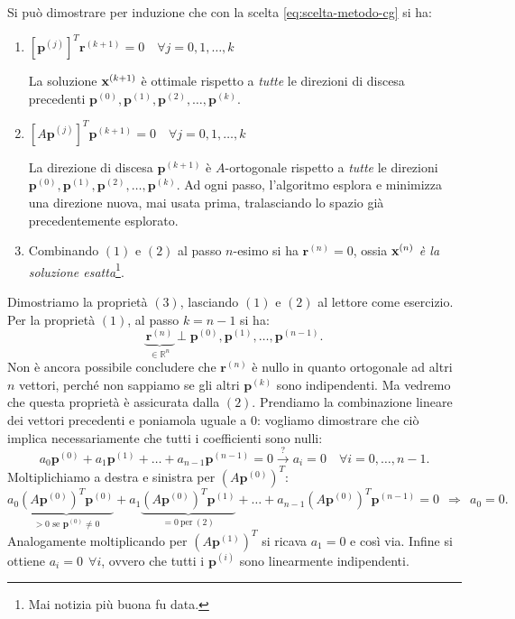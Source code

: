Si può dimostrare per induzione che con la scelta \eqref{eq:scelta-metodo-cg} si ha:
\begin{enumerate}
\item $\left[\mathbf{p}^{(j)}\right]^{T}\mathbf{r}^{( k+1)} =0 \quad \forall j=0,1,\dotsc ,k$

La soluzione $\mathbf{x}^{( k+1)}$ è ottimale rispetto a \textit{tutte} le direzioni di discesa precedenti $\mathbf{p}^{(0)} ,\mathbf{p}^{(1)} ,\mathbf{p}^{(2)} ,\dotsc ,\mathbf{p}^{(k)}$.
\item $\left[ A\mathbf{p}^{(j)}\right]^{T}\mathbf{p}^{( k+1)} =0 \quad \forall j=0,1,\dotsc ,k$

La direzione di discesa $\mathbf{p}^{( k+1)}$ è $A$-ortogonale rispetto a \textit{tutte} le direzioni $\mathbf{p}^{(0)} ,\mathbf{p}^{(1)} ,\mathbf{p}^{(2)} ,\dotsc ,\mathbf{p}^{(k)}$. Ad ogni passo, l'algoritmo esplora e minimizza una direzione nuova, mai usata prima, tralasciando lo spazio già precedentemente esplorato.
\item Combinando $(1)$ e $(2)$ al passo $n$-esimo si ha $\mathbf{r}^{(n)} =0$, ossia $\mathbf{x}^{(n)}$ \textit{è la soluzione esatta}\footnote{Mai notizia più buona fu data.}.
\end{enumerate}

Dimostriamo la proprietà $(3)$, lasciando $(1)$ e $(2)$ al lettore come esercizio.
Per la proprietà $(1)$, al passo $k=n-1$ si ha:
\begin{equation*}
\underbrace{\mathbf{r}^{(n)}}_{\in \mathbb{R}^{n}} \perp \mathbf{p}^{(0)} ,\mathbf{p}^{(1)} ,\dotsc ,\mathbf{p}^{( n-1)}.
\end{equation*}
Non è ancora possibile concludere che $\mathbf{r}^{(n)}$ è nullo in quanto ortogonale ad altri $n$ vettori, perché non sappiamo se gli altri $\mathbf{p}^{(k)}$ sono indipendenti.
Ma vedremo che questa proprietà è assicurata dalla $(2)$.
Prendiamo la combinazione lineare dei vettori precedenti e poniamola uguale a $0$: vogliamo dimostrare che ciò implica necessariamente che tutti i coefficienti sono nulli:
\begin{equation*}
a_{0}\mathbf{p}^{(0)} +a_{1}\mathbf{p}^{(1)} +\dotsc +a_{n-1}\mathbf{p}^{( n-1)} =0\xrightarrow{\text{?}} a_{i} =0\quad\forall i=0,\dotsc ,n-1.
\end{equation*}
Moltiplichiamo a destra e sinistra per $\left( A\mathbf{p}^{(0)}\right)^{T}$:
\begin{equation*}
a_{0}\underbrace{\left( A\mathbf{p}^{(0)}\right)^{T}\mathbf{p}^{(0)}}_{ >0\text{ se }\mathbf{p}^{(0)} \neq 0} +a_{1}\underbrace{\left( A\mathbf{p}^{(0)}\right)^{T}\mathbf{p}^{(1)}}_{=0\ \text{per} \ (2)} +\dotsc +a_{n-1}\left( A\mathbf{p}^{(0)}\right)^{T}\mathbf{p}^{( n-1)} =0 \ \ \Rightarrow \ \ a_{0} =0.
\end{equation*}
Analogamente moltiplicando per $\left( A\mathbf{p}^{(1)}\right)^{T}$ si ricava $a_{1} =0$ e così via. Infine si ottiene $a_{i} =0\ \ \forall i$, ovvero che tutti i $\mathbf{p}^{(i)}$ sono linearmente indipendenti. \textqed


